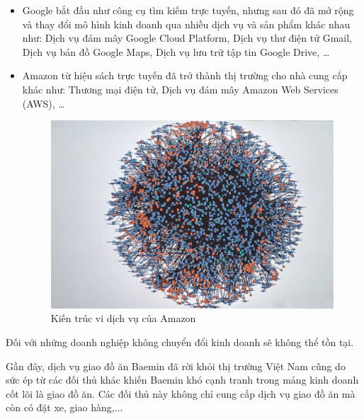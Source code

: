 \begin{example}

\begin{itemize}

\item Google bắt đầu như công cụ tìm kiếm trực tuyến, nhưng sau đó đã mở rộng và thay đổi mô hình kinh doanh qua nhiều dịch vụ và sản phẩm khác nhau như: Dịch vụ đám mây Google Cloud Platform, Dịch vụ thư điện tử Gmail, Dịch vụ bản đồ Google Maps, Dịch vụ lưu trữ tập tin Google Drive, \dots

\item Amazon từ hiệu sách trực tuyến đã trở thành thị trường cho nhà cung cấp khác như: Thương mại điện tử, Dịch vụ đám mây Amazon Web Services (AWS), \dots

\begin{figure}[H]

\centering

\includegraphics[scale = 0.5]{pictures/kien_truc_vi_dich_vu_cua_amazon/main.png}

\caption{Kiến trúc vi dịch vụ của Amazon}

\end{figure}

\end{itemize}

\end{example}

Đối với những doanh nghiệp không chuyển đổi kinh doanh sẽ không thể tồn tại.

\begin{example} Gần đây, dịch vụ giao đồ ăn Baemin đã rời khỏi thị trường Việt Nam cũng do sức ép từ các đối thủ khác khiến Baemin khó cạnh tranh trong mảng kinh doanh cốt lõi là giao đồ ăn. Các đối thủ này không chỉ cung cấp dịch vụ giao đồ ăn mà còn có đặt xe, giao hàng,...

\end{example}

